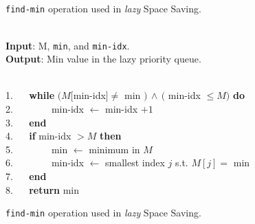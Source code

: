 \ifdefined\noauthorea
\begin{figure}[h!]
\IncMargin{2em}
\begin{algorithm}[H]
\LinesNumbered
\SetAlgoNoLine
\SetNlSkip{1.5em} 
\Indm\Indmm
\nonl\hrulefill\\
\vspace{-2mm}\hrulefill\\
\Indp\Indpp
{}
\\
\vspace{-2mm}
\Indm\Indmm
\nonl\hrulefill\vspace{1mm}\\
\DecMargin{3.5em}
\caption{\label{alg:hcct-findMin} {\tt find-min} operation used in {\em lazy} Space Saving.}
\IncMargin{1.5em}
\end{algorithm}
\end{figure}

\else
\begin{figure}[ht]
\caption{\label{alg:hcct-findMin} {\tt find-min} operation used in {\em lazy} Space Saving.}
\begin{small}
\begin{minipage}{0.9\textwidth}
\hrulefill\\
\textbf{Input}: {M, {\tt min}, and {\tt min-idx}.}\\
\textbf{Output}: {Min value in the lazy priority queue.}

\vspace{-1mm}
\hrulefill\\
1. ~~ \textbf{while} $(M[$min-idx$] \neq$ min $)\,\wedge\,($ min-idx $\leq M)$ \textbf{do}\\
2. ~~ ~~~~ min-idx $\gets$ min-idx $+ 1$\\
3. ~~ \textbf{end}\\
4. ~~ \textbf{if} min-idx $> M$ \textbf{then}\\
5. ~~ ~~~~ min $\gets$ minimum in $M$\\
6. ~~ ~~~~ min-idx $\gets$ smallest index $j$ s.t. $M[j] =$ min\\
7. ~~ \textbf{end}\\
8. ~~ \textbf{return} min

\vspace{-1mm}
\hrulefill
\vspace{-2mm}
\end{minipage}
\end{small}
\end{figure}
\fi

